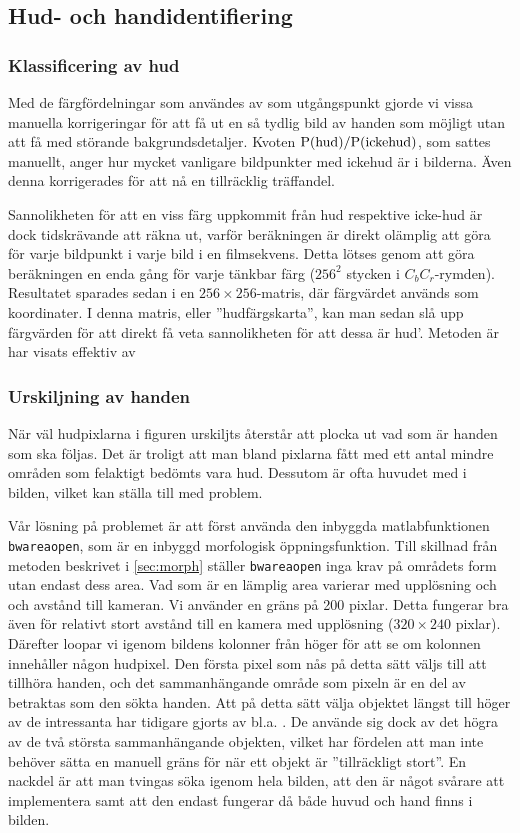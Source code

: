 \subsection{Hud- och handidentifiering}

\subsubsection{Klassificering av hud}
Med de färgfördelningar som användes av 
som utgångspunkt gjorde vi vissa manuella korrigeringar för att få ut
en så tydlig bild av handen som möjligt utan att få med störande
bakgrundsdetaljer. Kvoten $\mathrm{P}(\textrm{hud})/\mathrm{P}(\textrm{ickehud})$, som sattes
manuellt, anger hur mycket vanligare bildpunkter med ickehud är i
bilderna. Även denna korrigerades för att nå en tillräcklig träffandel.

Sannolikheten för att en viss färg uppkommit från hud respektive
icke-hud är dock tidskrävande att räkna ut, varför beräkningen
är direkt olämplig att göra för varje bildpunkt i varje bild i en
filmsekvens. Detta lötses genom att göra beräkningen en enda gång för
varje tänkbar färg ($256^2$ stycken i $C_bC_r$-rymden). Resultatet sparades
sedan i en $256\times256$-matris, där färgvärdet används som koordinater.
I denna matris, eller ''hudfärgskarta'', kan man sedan slå upp
färgvärden för att direkt få veta sannolikheten för att dessa är
hud'. Metoden är har visats effektiv av 

\subsubsection{Urskiljning av handen}

När väl hudpixlarna i figuren urskiljts återstår att plocka ut
vad som är handen som ska följas. Det är troligt att man bland
pixlarna fått med ett antal mindre områden som felaktigt bedömts vara
hud. Dessutom är ofta huvudet med i bilden, vilket kan ställa till med
problem. 

Vår lösning på problemet är att först använda den inbyggda
matlabfunktionen \texttt{bwareaopen}, som är en inbyggd morfologisk
öppningsfunktion. Till skillnad från metoden beskrivet i
\ref{sec:morph} ställer \texttt{bwareaopen} inga
krav på områdets form utan endast dess area. Vad som är en lämplig area
varierar med upplösning och
och avstånd till kameran. Vi använder en gräns på 200
pixlar. Detta fungerar bra även för relativt stort avstånd till
 en kamera med upplösning ($320\times240$ pixlar). Därefter loopar vi
igenom bildens kolonner från
höger för att se om kolonnen innehåller någon hudpixel. Den första
pixel som nås på detta sätt väljs till att tillhöra handen, och det
sammanhängande område som pixeln är en del av betraktas som den sökta
handen. Att på detta sätt välja objektet längst till höger av de
intressanta har tidigare gjorts av bl.a. . De använde
sig dock av det högra av de två största sammanhängande objekten,
vilket har fördelen att man inte behöver sätta en manuell gräns för
när ett objekt är ''tillräckligt stort''. En nackdel är att man tvingas
söka igenom hela bilden, att den är något svårare att
implementera samt att den endast fungerar då både huvud och hand finns
i bilden.

